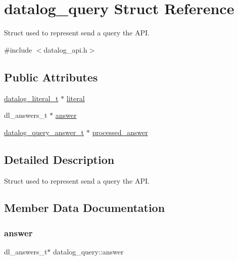 \hypertarget{structdatalog__query}{}\section{datalog\+\_\+query Struct Reference}
\label{structdatalog__query}


Struct used to represent send a query the A\+PI.  




{\ttfamily \#include $<$datalog\+\_\+api.\+h$>$}

\subsection*{Public Attributes}
\begin{DoxyCompactItemize}
\item 
\hyperlink{datalog__api_8h_aeb86f46db4f8142eeb397d20f69f6487}{datalog\+\_\+literal\+\_\+t} $\ast$ \hyperlink{structdatalog__query_ae91a9dea687ce035816c38593d171e75}{literal}
\item 
dl\+\_\+answers\+\_\+t $\ast$ \hyperlink{structdatalog__query_a4b71bfe53acdc4a04a8816527127a078}{answer}
\item 
\hyperlink{datalog__api_8h_a34c189d3b3a5d5821691c8237e3922e6}{datalog\+\_\+query\+\_\+answer\+\_\+t} $\ast$ \hyperlink{structdatalog__query_a54e2eef2c18bc5e4c0f0a6c10f1e6397}{processed\+\_\+answer}
\end{DoxyCompactItemize}


\subsection{Detailed Description}
Struct used to represent send a query the A\+PI. 

\subsection{Member Data Documentation}
\mbox{\label{structdatalog__query_a4b71bfe53acdc4a04a8816527127a078}} 
\subsubsection{\texorpdfstring{answer}{answer}}
{\footnotesize\ttfamily dl\+\_\+answers\+\_\+t$\ast$ datalog\+\_\+query\+::answer}

